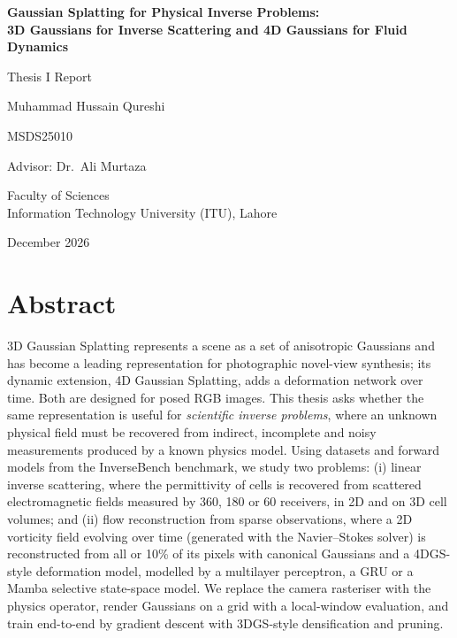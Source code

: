 \documentclass[12pt,a4paper,oneside]{report}
\newcommand{\thesistitle}{Gaussian Splatting for Physical Inverse Problems:\\[0.3em]
  3D Gaussians for Inverse Scattering and 4D Gaussians for Fluid Dynamics}
\newcommand{\authorname}{Muhammad Hussain Qureshi}
\newcommand{\rollno}{MSDS25010}
\newcommand{\advisorname}{Dr.\ Ali Murtaza}
\newcommand{\department}{Faculty of Sciences}
\newcommand{\university}{Information Technology University (ITU), Lahore}
\newcommand{\submissiondate}{December 2026}
\begin{document}
\begin{titlepage}
  \centering
  \vspace*{1.5cm}
  {\LARGE\bfseries \thesistitle\par}
  \vspace{1.5cm}
  {\large Thesis I Report\par}
  \vspace{1.5cm}
  {\large \authorname\par}
  {\large \rollno\par}
  \vspace{1.0cm}
  {\large Advisor: \advisorname\par}
  \vfill
  {\large \department\\ \university\par}
  \vspace{0.5cm}
  {\large \submissiondate\par}
\end{titlepage}


\chapter*{Abstract}
3D Gaussian Splatting represents a scene as a set of anisotropic Gaussians and has become a leading
representation for photographic novel-view synthesis; its dynamic extension, 4D Gaussian Splatting, adds a
deformation network over time. Both are designed for posed RGB images. This thesis asks whether the same
representation is useful for \emph{scientific inverse problems}, where an unknown physical field must be recovered
from indirect, incomplete and noisy measurements produced by a known physics model. Using datasets and forward
models from the InverseBench benchmark, we study two problems: (i) linear inverse scattering, where the permittivity
of cells is recovered from scattered electromagnetic fields measured by 360, 180 or 60 receivers, in 2D and on 3D
cell volumes; and (ii) flow reconstruction from sparse observations, where a 2D vorticity field evolving over time
(generated with the Navier--Stokes solver) is reconstructed from all or 10\% of its pixels with canonical Gaussians
and a 4DGS-style deformation model, modelled by a multilayer perceptron, a GRU or a Mamba selective state-space
model. We replace the camera rasteriser with the physics operator, render Gaussians on a grid with a
local-window evaluation, and train end-to-end by gradient descent with 3DGS-style densification and pruning.
\end{document}
